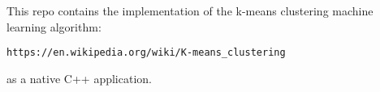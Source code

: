 This repo contains the implementation of the k-\/means clustering machine learning algorithm\+:

{\tt https\+://en.\+wikipedia.\+org/wiki/\+K-\/means\+\_\+clustering}

as a native C++ application. 
